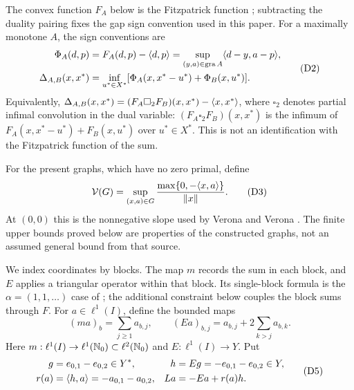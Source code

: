 The convex function $F_A$ below is the Fitzpatrick function
\cite{fitzpatrick1988}; subtracting the duality pairing fixes the gap
sign convention used in this paper.
For a maximally monotone $A$, the sign conventions are
\begin{equation}
\begin{aligned}
\Phi_A(d,p)&=F_A(d,p)-\langle d,p\rangle
 =\sup_{(y,a)\in\operatorname{gra} A}\langle d-y,a-p\rangle,\\
\Delta_{A,B}(x,x^*)&=\inf_{u^*\in X^*}
 [\Phi_A(x,x^*-u^*)+\Phi_B(x,u^*)].
\end{aligned}
\tag{D2}\label{eq:D2}
\end{equation}
Equivalently, $\Delta_{A,B}(x,x^*)=(F_A\square_2 F_B)(x,x^*)
-\langle x,x^*\rangle$, where $\square_2$ denotes partial infimal convolution
in the dual variable: $(F_A\square_2 F_B)(x,x^*)$
is the infimum of $F_A(x,x^*-u^*)+F_B(x,u^*)$ over $u^*\in X^*$.
This is not an identification with the Fitzpatrick function of the sum.

For the present graphs, which have no zero primal, define
\begin{equation}
\mathcal V(G)=\sup_{(x,a)\in G}
 \frac{\max\{0,-\langle x,a\rangle\}}{\|x\|}.
\tag{D3}\label{eq:D3}
\end{equation}
At $(0,0)$ this is the nonnegative slope used by Verona and Verona
\cite{verona2008}. The finite upper bounds proved below are properties
of the constructed graphs, not an assumed general bound from that source.

We index coordinates by blocks. The map $m$ records the sum in each block,
and $E$ applies a triangular operator within that block. Its single-block
formula is the $\alpha=(1,1,\ldots)$ case of
\cite[author version, Example~4.1]{bauschkeetal2011}; the additional constraint below
couples the block sums through $F$.
For $a\in\ell^1(I)$, define the bounded maps
\begin{equation}
(ma)_b=\sum_{j\ge1}a_{b,j},\qquad
(Ea)_{b,j}=a_{b,j}+2\sum_{k>j}a_{b,k}.
\tag{D4}\label{eq:D4}
\end{equation}
Here $m:\ell^1(I)\to\ell^1(\mathbb N_0)\subset\ell^2(\mathbb N_0)$ and
$E:\ell^1(I)\to Y$. Put
\begin{equation}
\begin{aligned}
g&=e_{0,1}-e_{0,2}\in Y^*,&
h&=Eg=-e_{0,1}-e_{0,2}\in Y,\\
r(a)&=\langle h,a\rangle=-a_{0,1}-a_{0,2},&
La&=-Ea+r(a)h.
\end{aligned}
\tag{D5}\label{eq:D5}
\end{equation}

